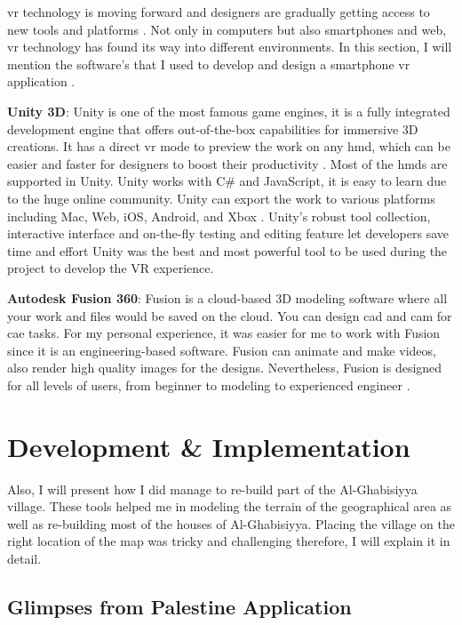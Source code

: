 \acrshort{vr} technology is moving forward and designers are gradually getting access to new tools and platforms \citep{Bamodu2013VirtualComponents}. Not only in computers but also smartphones and web, \acrshort{vr} technology has found its way into different environments. In this section, I will mention the software's that I used to develop and design a smartphone \acrshort{vr} application . 


\textbf{Unity 3D}: Unity is one of the most famous game engines, it is a  fully integrated development engine that offers out-of-the-box capabilities for immersive 3D creations. It has a direct \acrshort{vr} mode to preview the work on any \acrlong{hmd}, which can be easier and faster for designers to boost their productivity \citep{Kim2014UsingDevelopment}. Most of the \acrlong{hmd}s are supported in Unity. Unity works with C\# and JavaScript, it is easy to learn due to the huge online community. Unity can export the work to various platforms including Mac, Web, iOS, Android, and Xbox \citep{Kim2014UsingDevelopment}. Unity's robust tool collection, interactive interface and on-the-fly testing and editing feature let developers save time and effort Unity was the best and most powerful tool to be used during the project to develop the VR experience.

\textbf{Autodesk Fusion 360}: Fusion is a cloud-based 3D modeling software where all your work and files would be saved on the cloud. You can design \acrfull{cad} and \acrfull{cam} for \acrfull{cae} tasks. For my personal experience, it was easier for me to work with Fusion since it is an engineering-based software.  Fusion can animate and make videos, also render high quality images for the designs. Nevertheless, Fusion is designed for all levels of users, from beginner to modeling to experienced engineer \citep{Cline2018FusionFabrication}. 

\section{Development \& Implementation}

 Also, I will present how I did manage to re-build part of the Al-Ghabisiyya village. These tools helped me in modeling the terrain of the geographical area as well as re-building most of the houses of Al-Ghabisiyya. Placing the village on the right location of the map was tricky and challenging therefore, I will explain it in detail. 

\subsection{Glimpses from Palestine Application}

